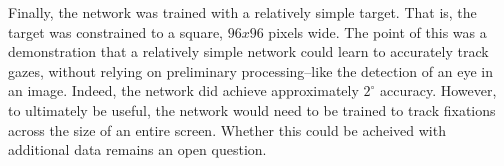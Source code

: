 \documentclass[10pt,letterpaper]{article}
\begin{document}
Finally, the network was trained with a relatively simple target. That is, the target was constrained to a square, $96x96$ pixels wide. The point of this was a demonstration that a relatively simple network could learn to accurately track gazes, without relying on preliminary processing--like the detection of an eye in an image. Indeed, the network did achieve approximately $2^{\circ}$ accuracy. However, to ultimately be useful, the network would need to be trained to track fixations across the size of an entire screen. Whether this could be acheived with additional data remains an open question. 




\setlength{\bibleftmargin}{.125in}
\setlength{\bibindent}{-\bibleftmargin}


\end{document}
